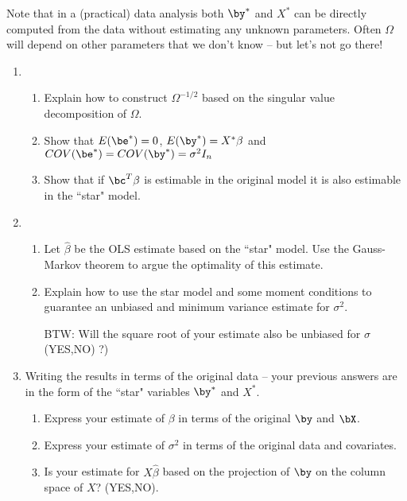 \documentclass[11pt]{report}
\begin{document}
  Note that in a  (practical) data analysis both  $\by^*$  and $X^*$ can be directly computed from the data without estimating any unknown parameters.  Often $\Omega$ will depend on other parameters that we don't know -- but let's not go there! 
  \begin{enumerate}
 \item 
 \begin{enumerate}
 \item Explain how to construct $\Omega^{-1/2}$ based on the singular value decomposition of $\Omega$.
 
 
 \item Show that  $E( \be^*) =0 $,  $E( \by^*) = X^* \beta $ and  $COV(\be^*) = COV( \by^*) = \sigma^2 I_n $
 
 \item Show that if $\bc^T \beta$ is estimable in the original model it is also estimable in the ``star" model. 
 
 
 \end{enumerate}
 
 \item 
 \begin{enumerate}
 \item Let $\hat{\beta}$ be the OLS estimate based on the ``star" model. Use the Gauss-Markov theorem to argue the optimality of this estimate. 
 
\item 
Explain how to use the star model  and some moment conditions to guarantee an unbiased and minimum variance estimate for $\sigma^2$.

BTW: Will the square root of your estimate also be unbiased for $\sigma$ (YES,NO) ?)  

\end{enumerate}

\item Writing the results in terms of the original data --
 your previous answers are in  the form of the ``star" variables  $\by^*$ and $X^*$. 
\begin{enumerate}
\item  Express your estimate of $\beta$ in terms of the original $\by$ and $\bX$. 
\item  Express your estimate of $\sigma^2$ in terms of the original data and covariates. 
\item  Is your estimate for $X\hat{\beta}$ based on the  projection of  $\by$ on the column space of $X$?
 (YES,NO). 
   
\end{enumerate}


\end{enumerate}
\end{document}
